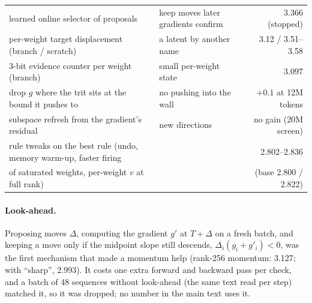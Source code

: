 \documentclass[10pt,twocolumn]{article}
\begin{document}
\begin{table}[t]
{\begin{tabular}{llr}
learned online selector of proposals & keep moves later gradients confirm & 3.366 (stopped) \\
per-weight target displacement (branch / scratch) & a latent by another name & 3.12 / 3.51--3.58 \\
3-bit evidence counter per weight (branch) & small per-weight state & 3.097 \\
drop $g$ where the trit sits at the bound it pushes to & no pushing into the wall & $+0.1$ at 12M tokens \\
subspace refresh from the gradient's residual & new directions & no gain (20M screen) \\
rule tweaks on the best rule (undo, memory warm-up, faster firing & & 2.802--2.836 \\
\quad of saturated weights, per-weight $v$ at full rank) & & (base 2.800 / 2.822) \\
\bottomrule
\end{tabular}}
\end{table}

\paragraph{Look-ahead.} Proposing moves $\Delta$, computing the gradient $g'$ at $T+\Delta$ on a fresh batch, and keeping
a move only if the midpoint slope still descends, $\Delta_i(g_i+g'_i)<0$, was the first mechanism that made a momentum
help (rank-256 momentum: 3.127; with ``sharp'', 2.993). It costs one extra forward and backward pass per check, and a
batch of 48 sequences without look-ahead (the same text read per step) matched it, so it was dropped; no number in the
main text uses it.
\end{document}
